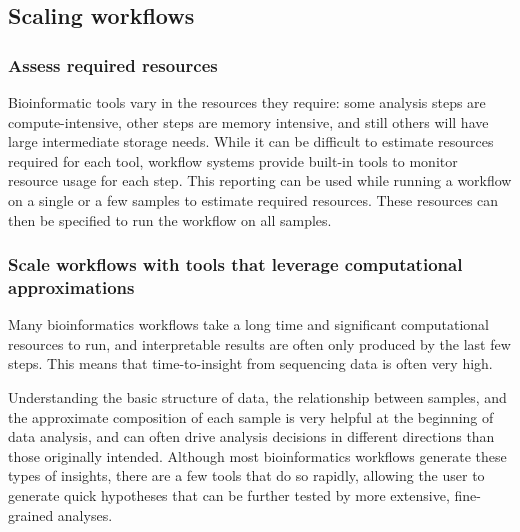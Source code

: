 \documentclass[10pt,letterpaper]{article}
\begin{document}
\subsection*{Scaling workflows} %

\subsubsection*{Assess required resources}

Bioinformatic tools vary in the resources they require: some analysis steps are compute-intensive, other steps are memory intensive, and still others will have large intermediate storage needs. 
While it can be difficult to estimate resources required for each tool, workflow systems provide built-in tools to monitor resource usage for each step. 
This reporting can be used while running a workflow on a single or a few samples to estimate required resources. 
These resources can then be specified to run the workflow on all samples.
 
\subsubsection*{Scale workflows with tools that leverage computational approximations}
 
 Many bioinformatics workflows take a long time and significant computational resources to run, and interpretable results are often only produced by the last few steps. 
This means that time-to-insight from sequencing data is often very high. 
 
Understanding the basic structure of data, the relationship between samples, and the approximate composition of each sample is very helpful at the beginning of data analysis, and can often drive analysis decisions in different directions than those originally intended. 
Although most bioinformatics workflows generate these types of insights, there are a few tools that do so rapidly, allowing the user to generate quick hypotheses that can be further tested by more extensive, fine-grained analyses. 
\end{document}

